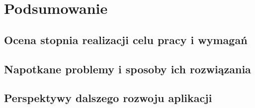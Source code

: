 \chapter{Podsumowanie}
\label{cha:podsumowanie}

\section{Ocena stopnia realizacji celu pracy i wymagań}
\label{sec:ocena_celu}

\section{Napotkane problemy i sposoby ich rozwiązania}
\label{sec:problemy}

\section{Perspektywy dalszego rozwoju aplikacji}
\label{sec:perspektywy}

